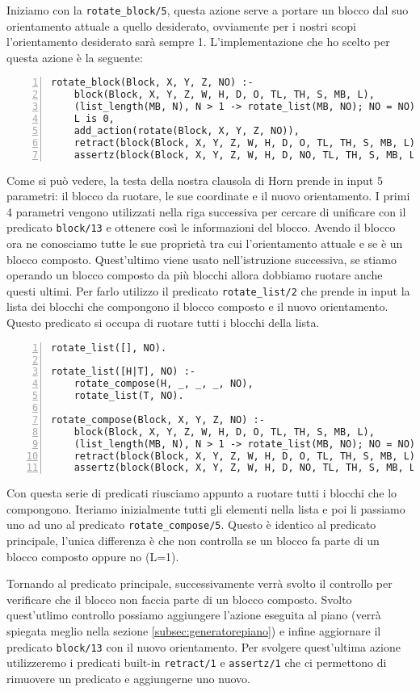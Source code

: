Iniziamo con la \verb+rotate_block/5+, questa azione serve a portare un blocco dal suo orientamento attuale a quello desiderato, ovviamente per i nostri scopi l'orientamento desiderato sarà sempre 1.
L'implementazione che ho scelto per questa azione è la seguente:
\begin{Verbatim}[numbers=left]
rotate_block(Block, X, Y, Z, NO) :-
    block(Block, X, Y, Z, W, H, D, O, TL, TH, S, MB, L),
    (list_length(MB, N), N > 1 -> rotate_list(MB, NO); NO = NO),
    L is 0,
    add_action(rotate(Block, X, Y, Z, NO)),
    retract(block(Block, X, Y, Z, W, H, D, O, TL, TH, S, MB, L)),
    assertz(block(Block, X, Y, Z, W, H, D, NO, TL, TH, S, MB, L)).
\end{Verbatim}
Come si può vedere, la testa della nostra clausola di Horn prende in input 5 parametri: il blocco da ruotare, le sue coordinate e il nuovo orientamento. I primi 4 parametri vengono utilizzati nella riga successiva per cercare di unificare con il predicato \verb+block/13+ e ottenere così le informazioni del blocco.
Avendo il blocco ora ne conosciamo tutte le sue proprietà tra cui l'orientamento attuale e se è un blocco composto. Quest'ultimo viene usato nell'istruzione successiva, se stiamo operando un blocco composto da più blocchi allora dobbiamo ruotare anche questi ultimi. Per farlo utilizzo il predicato \verb+rotate_list/2+ che prende in input la lista dei blocchi che compongono il blocco composto e il nuovo orientamento. Questo predicato si occupa di ruotare tutti i blocchi della lista.
\begin{Verbatim}[numbers=left]
rotate_list([], NO).

rotate_list([H|T], NO) :-
    rotate_compose(H, _, _, _, NO),
    rotate_list(T, NO).

rotate_compose(Block, X, Y, Z, NO) :-
    block(Block, X, Y, Z, W, H, D, O, TL, TH, S, MB, L),
    (list_length(MB, N), N > 1 -> rotate_list(MB, NO); NO = NO),
    retract(block(Block, X, Y, Z, W, H, D, O, TL, TH, S, MB, L)),
    assertz(block(Block, X, Y, Z, W, H, D, NO, TL, TH, S, MB, L)).
\end{Verbatim}
Con questa serie di predicati riusciamo appunto a ruotare tutti i blocchi che lo compongono. Iteriamo inizialmente tutti gli elementi nella lista e poi li passiamo uno ad uno al predicato \verb+rotate_compose/5+. Questo è identico al predicato principale, l'unica differenza è che non controlla se un blocco fa parte di un blocco composto oppure no (L=1).

Tornando al predicato principale, successivamente verrà svolto il controllo per verificare che il blocco non faccia parte di un blocco composto. Svolto quest'utlimo controllo possiamo aggiungere l'azione eseguita al piano (verrà spiegata meglio nella sezione \ref{subsec:generatorepiano}) e infine aggiornare il predicato \verb+block/13+ con il nuovo orientamento.
Per svolgere quest'ultima azione utilizzeremo i predicati built-in \verb+retract/1+ e \verb+assertz/1+ che ci permettono di rimuovere un predicato e aggiungerne uno nuovo.

